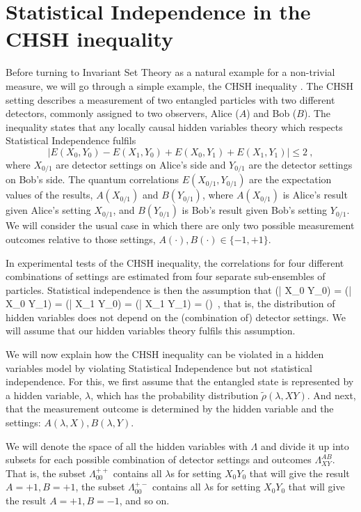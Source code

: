 \documentclass[12pt,superscriptaddress]{revtex4-2}
\makeatletter
\newcommand\be{\@ifstar{\[}{\begin{equation}}}
\newcommand\ee{\@ifstar{\]}{\end{equation}}}
\makeatother
\begin{document}
\section{Statistical Independence in the CHSH inequality}
\label{CHSH}

Before turning to Invariant Set Theory as a natural example for a non-trivial measure, we will go through a simple example, the {\sc CHSH} inequality \cite{Clauser1969CHSH}.
The {\sc CHSH} setting describes a measurement of two entangled particles with two different detectors, commonly assigned to two observers, Alice ($A$) and Bob ($B$). The inequality states that any locally causal hidden variables theory which respects Statistical Independence fulfils
\begin{equation}
   \big| E(X_0,Y_0)-E(X_1,Y_0)+E(X_0,Y_1)+E(X_1,Y_1) \big| \leq 2~,
\end{equation}
where $X_{0/1}$ are detector settings on Alice's side and $Y_{0/1}$ are the detector settings on Bob's side. The quantum correlations $E(X_{0/1},Y_{0/1})$ are the expectation values of the results, $A(X_{0/1})$ and $B(Y_{0/1})$, where $A(X_{0/1})$ is Alice's result given Alice's setting $X_{0/1}$, and $B(Y_{0/1})$ is Bob's result given Bob's setting $Y_{0/1}$. 
We will consider the usual case in which there are only two possible measurement outcomes relative to those settings, $A(\cdot),B(\cdot) \in \{-1,+1 \}$.

In experimental tests of the {\sc CHSH} inequality, the correlations for four different combinations of settings are estimated from four separate sub-ensembles of particles. 
Statistical independence is then the assumption that 
\be
\label{SI3}
\tilde \rho (\lambda | X_0 Y_0) = \tilde \rho(\lambda | X_0 Y_1) = \tilde \rho(\lambda | X_1 Y_0) = \tilde \rho(\lambda | X_1 Y_1) = \tilde \rho(\lambda)~,
\ee
that is, the distribution of hidden variables does not depend on the (combination of) detector settings. We will assume that our hidden variables theory fulfils this assumption.

We will now explain how the {\sc CHSH} inequality can be violated in a hidden variables model by violating Statistical Independence but not statistical independence. For this, we first assume that the entangled state is represented by a hidden variable, $\lambda$, which has the probability distribution $\tilde \rho(\lambda,XY)$. And next, that the measurement outcome is determined by the hidden variable and the settings: $A(\lambda,X), B(\lambda,Y)$.

We will denote the space of all the hidden variables with $\Lambda$ and divide it up into subsets for each possible combination of detector settings and outcomes $\Lambda_{XY}^{AB}$. That is, the subset $\Lambda^{++}_{00}$ contains all $\lambda$s for setting $X_0Y_0$ that will give the result $A=+1,B=+1$, the subset $\Lambda^{+-}_{00}$ contains all $\lambda$s for setting $X_0Y_0$ that will give the result $A=+1,B=-1$, and so on.
\end{document}

